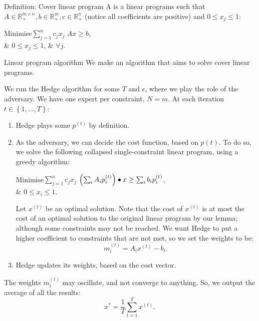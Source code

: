 \documentclass[a4paper]{article}
\begin{document}
\begin{parag}{Definition: Cover linear program}
    A  is a linear programs such that $A \in \mathbb{R}_+^{m \times n}, b \in \mathbb{R}_+^m, c \in \mathbb{R}_+^n$ (notice all coefficients are positive) and $0 \leq x_j \leq 1$: 
    \begin{linearprogram}{Minimise}{$\sum_{j=1}^{n} c_j x_j$}
        $Ax \geq b$, \\
        & $0 \leq x_j \leq 1$, & $\forall j$.
    \end{linearprogram}
\end{parag}


\begin{parag}{Linear program algorithm}
    We make an algorithm that aims to solve cover linear programs.

    We run the Hedge algorithm for some $T$ and $\epsilon$, where we play the role of the adversary. We have one expert per constraint, $N = m$. At each iteration $t \in \left\{1, \ldots, T\right\}$:
    \begin{enumerate}
        \item Hedge plays some $p^{\left(t\right)}$ by definition.
        \item As the adversary, we can decide the cost function, based on $p\left(t\right)$. To do so, we solve the following collapsed single-constraint linear program, using a greedy algorithm:
        \begin{linearprogram}{Minimise}{$\sum_{j=1}^{n} c_j x_j$}
            $\left(\sum_{i} A_i p_i^{\left(t\right)}\right) \dotprod x \geq \sum_{i} b_i p_i^{\left(t\right)}$, \\
            & $0 \leq x_i \leq 1$.
        \end{linearprogram}
        Let $x^{\left(t\right)}$ be an optimal solution. Note that the cost of $x^{\left(t\right)}$ is at most the cost of an optimal solution to the original linear program by our lemma; although some constraints may not be reached. We want Hedge to put a higher coefficient to constraints that are not met, so we set the weights to be: 
        \[m_i^{\left(t\right)} = A_i x^{\left(t\right)} - b_i.\] 
        \item Hedge updates its weights, based on the cost vector.
    \end{enumerate}

    The weights $m_i^{\left(t\right)}$ may oscillate, and not converge to anything. So, we output the average of all the results: 
    \[x^* = \frac{1}{T} \sum_{t=1}^{T} x^{\left(t\right)}.\]
\end{parag}
\end{document}

